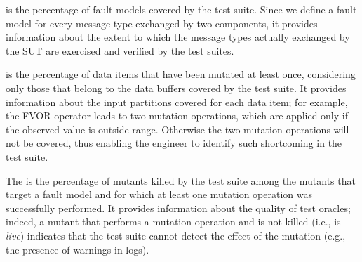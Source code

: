 is the percentage of fault models covered by the test suite. Since we define a fault model for every 
message type exchanged by two components,
it provides information about the extent to which the message types actually exchanged by the SUT are exercised and verified by the test suites. 

 is the percentage of data items that have been mutated at least once, considering only those that belong to the data buffers covered by the test suite. It provides information about the input partitions covered for each data item; for example, the FVOR operator leads to two mutation operations, which are applied only if the observed value is outside range. Otherwise the two mutation operations will not be covered, thus enabling the engineer to identify such shortcoming in the test suite.

The  is the percentage of mutants killed by the test suite  among the mutants that target a fault model and for which at least one mutation operation was successfully performed. It provides information about the quality of test oracles; indeed, a mutant that performs a mutation operation and is not killed (i.e., is \emph{live}) indicates that the test suite cannot detect the effect of the mutation (e.g., the presence of warnings in logs).

